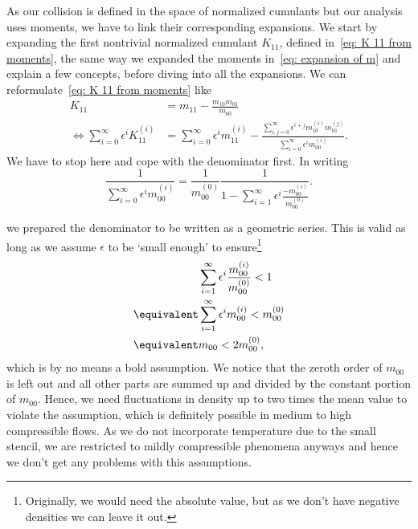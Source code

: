As our collision is defined in the space of normalized cumulants but our analysis uses moments, we have to link their corresponding expansions.
We start by expanding the first nontrivial normalized cumulant $K_{11}$, defined in~\eqref{eq: K 11 from moments}, the same way we expanded the moments in~\eqref{eq: expansion of m} and explain a few concepts, before diving into all the expansions.
We can reformulate~\eqref{eq: K 11 from moments} like
\begin{equation}
  \label{eq: first expansion}
  \begin{aligned}
    K_{11} & = m_{11} - \frac{m_{10}m_{01}}{m_{00}}\\
    \Leftrightarrow
    \sum_{i=0}^\infty \epsilon^i K_{11}^{(i)}
    & = \sum_{i=0}^\infty \epsilon^i m_{11}^{(i)} -
    \frac{\sum_{i,j=0}^\infty \epsilon^{i+j} m_{10}^{(i)}m_{01}^{(j)}}
        {\sum_{i=0}^\infty \epsilon^i m_{00}^{(i)}}.
  \end{aligned}
\end{equation}
We have to stop here and cope with the denominator first.
In writing
\begin{equation}
  \frac{1}{\sum_{i=0}^\infty \epsilon^i m_{00}^{(i)}}=
  \frac{1}{m_{00}^{(0)}}
  \frac{1}{1 - \sum_{i=1}^\infty \epsilon^i \frac{ - m_{00}^{(i)}}{ m_{00}^{(0)}}}.
\end{equation}

we prepared the denominator to be written as a geometric series.
This is valid as long as we assume $\epsilon$ to be `small enough' to ensure\footnote{Originally, we would need the absolute value, but as we don't have negative densities we can leave it out.}
\begin{align}
  &\sum_{i=1}^\infty \epsilon^i \frac{ m_{00}^{(i)}}{ m_{00}^{(0)}}  < 1
  \\
  \equivalent& \sum_{i=1}^\infty \epsilon^i  m_{00}^{(i)} < m_{00}^{(0)}
  \\
  \equivalent& m_{00} < 2 m_{00}^{(0)},
\end{align}
which is by no means a bold assumption.
We notice that the zeroth order of $m_{00}$ is left out and all other parts are summed up and divided by the constant portion of $m_{00}$.
Hence, we need fluctuations in density up to two times the mean value to violate the assumption, which is definitely possible in medium to high compressible flows.
As we do not incorporate temperature due to the small stencil, we are restricted to mildly compressible phenomena anyways and hence we don't get any problems with this assumptions.

